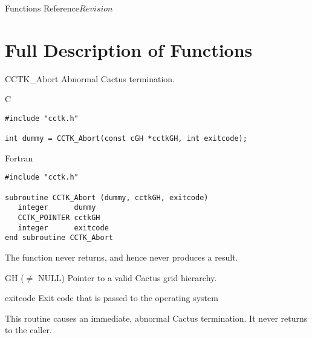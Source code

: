 \begin{cactuspart}{ Functions Reference}{}{$Revision$}
\begin{Lentry}
\end{Lentry}


\chapter{Full Description of Functions}


\begin{FunctionDescription}{CCTK\_Abort}
\label{CCTK-Abort}
Abnormal Cactus termination.

\begin{SynopsisSection}
\begin{Synopsis}{C}
\begin{verbatim}
#include "cctk.h"

int dummy = CCTK_Abort(const cGH *cctkGH, int exitcode);
\end{verbatim}
\end{Synopsis}
\begin{Synopsis}{Fortran}
\begin{verbatim}
#include "cctk.h"

subroutine CCTK_Abort (dummy, cctkGH, exitcode)
   integer      dummy
   CCTK_POINTER cctkGH
   integer      exitcode
end subroutine CCTK_Abort
\end{verbatim}
\end{Synopsis}
\end{SynopsisSection}

\begin{ResultSection}
\begin{Result}{}
The function never returns, and hence never produces a result.
\end{Result}
\end{ResultSection}

\begin{ParameterSection}
\begin{Parameter}{GH ($\ne$ NULL)}
Pointer to a valid Cactus grid hierarchy.
\end{Parameter}
\begin{Parameter}{exitcode}
Exit code that is passed to the operating system
\end{Parameter}
\end{ParameterSection}

\begin{Discussion}
This routine causes an immediate, abnormal Cactus termination.
It never returns to the caller.
\end{Discussion}


\end{FunctionDescription}
\end{cactuspart}
